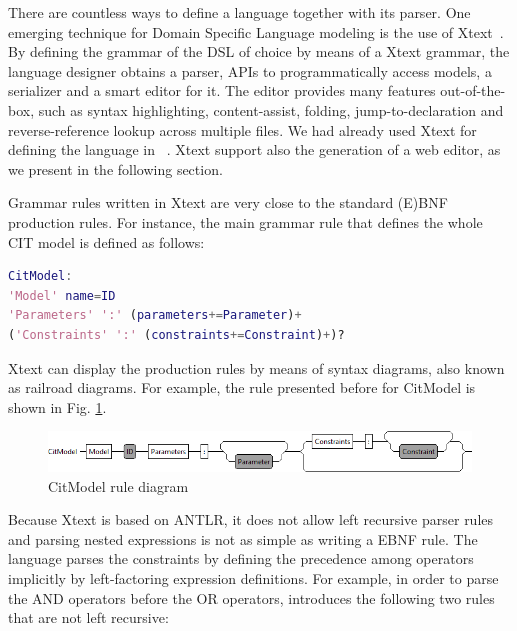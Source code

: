 \begin{tikzborder}{\cite{Gargantini16:validation}}
\begin{tikzborder}{\cite{gargantini_combinatorial_2017}}
\begin{tikzborder}{\cite{garn2019}}
\begin{tikzborder}{\cite{arcaini2019achieving}}
\begin{tikzborder}{}
There are countless ways to define a language together with its parser. One emerging technique for Domain Specific Language modeling is the use of Xtext~\cite{Eysholdt:2010}. By defining the grammar of the DSL of choice by means of a Xtext grammar, the language designer obtains a parser, APIs to programmatically access models, a serializer and a smart editor for it. The editor provides many features out-of-the-box, such as syntax highlighting, content-assist, folding, jump-to-declaration and reverse-reference lookup across multiple files.  We had already used Xtext for defining the language in \citlab~\cite{citlab12}. Xtext support also the generation of a web editor, as we present in the following section.

Grammar rules written in Xtext are very close to the standard (E)BNF production rules. For instance, the main grammar rule that defines the whole CIT model is defined as follows:
\end{tikzborder}

\begin{lstlisting}[language=Matlab,columns=fullflexible,basicstyle=\small\ttfamily,stringstyle=\ttfamily\color{blue},upquote=true]  
CitModel:
'Model' name=ID 
'Parameters' ':' (parameters+=Parameter)+ 
('Constraints' ':' (constraints+=Constraint)+)?
\end{lstlisting}

\begin{tikzborder}{}
Xtext can display the production rules by means of syntax diagrams, also known as railroad diagrams. For example, the rule presented before for {\small\ttfamily CitModel} is shown in Fig. \ref{fig:grammarrule}.
\end{tikzborder}

\begin{figure}
	\centering
	\includegraphics[width=1\linewidth]{images/grammar_rule}
	\caption{{\small\ttfamily CitModel} rule diagram}
	\label{fig:grammarrule}
\end{figure}

\begin{tikzborder}{}
Because Xtext is based on ANTLR, it does not allow left recursive parser rules and parsing nested expressions is not as simple as writing a EBNF rule. The \ctwedge language parses the constraints by defining the precedence among operators implicitly by left-factoring expression definitions. For example, in order to parse the AND operators before the OR operators,  \ctwedge  introduces the following two rules that are not left recursive:
\end{tikzborder}


\end{tikzborder}
\end{tikzborder}
\end{tikzborder}
\end{tikzborder}
